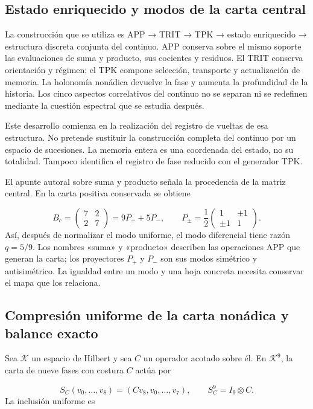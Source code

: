 \subsection{Estado enriquecido y modos de la carta central}
\label{tm-add-c1}
La construcción que se utiliza es APP → TRIT → TPK → estado enriquecido → estructura discreta conjunta del continuo. APP conserva sobre el mismo soporte las evaluaciones de suma y producto, sus cocientes y residuos. El TRIT conserva orientación y régimen; el TPK compone selección, transporte y actualización de memoria. La holonomía nonádica devuelve la fase y aumenta la profundidad de la historia. Los cinco aspectos correlativos del continuo no se separan ni se redefinen mediante la cuestión espectral que se estudia después.

Este desarrollo comienza en la realización del registro de vueltas de esa estructura. No pretende sustituir la construcción completa del continuo por un espacio de sucesiones. La memoria entera es una coordenada del estado, no su totalidad. Tampoco identifica el registro de fase reducido con el generador TPK.

El apunte autoral sobre suma y producto señala la procedencia de la matriz central. En la carta positiva conservada se obtiene

\[
B_c=\begin{pmatrix}7&2\\2&7\end{pmatrix}
=9P_++5P_-,\qquad
P_\pm=\frac12\begin{pmatrix}1&\pm1\\\pm1&1\end{pmatrix}.
\]
Así, después de normalizar el modo uniforme, el modo diferencial tiene razón \(q=5/9\). Los nombres «suma» y «producto» describen las operaciones APP que generan la carta; los proyectores \(P_+\) y \(P_-\) son sus modos simétrico y antisimétrico. La igualdad entre un modo y una hoja concreta necesita conservar el mapa que los relaciona.


\subsection{Compresión uniforme de la carta nonádica y balance exacto}
\label{tm-add-c2}
Sea \(\mathcal K\) un espacio de Hilbert y sea \(C\) un operador acotado sobre él. En \(\mathcal K^9\), la carta de nueve fases con costura \(C\) actúa por

\[
S_C(v_0,\ldots,v_8)=(Cv_8,v_0,\ldots,v_7),
\qquad S_C^9=I_9\otimes C.
\]
La inclusión uniforme es

